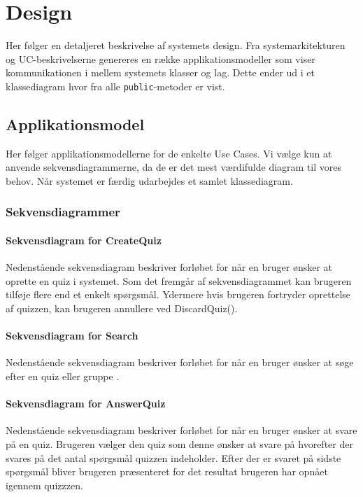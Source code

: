 \chapter{Design}
Her følger en detaljeret beskrivelse af systemets design. Fra systemarkitekturen og UC-beskrivelserne genereres en række applikationsmodeller som viser kommunikationen i mellem systemets klasser og lag. Dette ender ud i et klassediagram hvor fra alle \verb+public+-metoder er vist.

\section{Applikationsmodel}
Her følger applikationsmodellerne for de enkelte Use Cases.
Vi vælge kun at anvende sekvensdiagrammerne, da de er det mest værdifulde diagram til vores behov. 
Når systemet er færdig udarbejdes et samlet klassediagram.

\subsection{Sekvensdiagrammer}

\subsubsection{Sekvensdiagram for CreateQuiz}
Nedenstående sekvensdiagram beskriver forløbet for når en bruger ønsker at oprette en quiz i systemet. Som det fremgår af sekvensdiagrammet kan brugeren tilføje flere end et enkelt spørgsmål. Ydermere hvis brugeren fortryder oprettelse af quizzen, kan brugeren annullere ved DiscardQuiz().


\subsubsection{Sekvensdiagram for Search}
Nedenstående sekvensdiagram beskriver forløbet for når en bruger ønsker at søge efter en quiz eller gruppe .


\subsubsection{Sekvensdiagram for AnswerQuiz}
Nedenstående sekvensdiagram beskriver forløbet for når en bruger ønsker at svare på en quiz. Brugeren vælger den quiz som denne ønsker at svare på hvorefter der svares på det antal spørgsmål quizzen indeholder. Efter der er svaret på sidste spørgsmål bliver brugeren præsenteret for det resultat brugeren har opnået igennem quizzzen.

